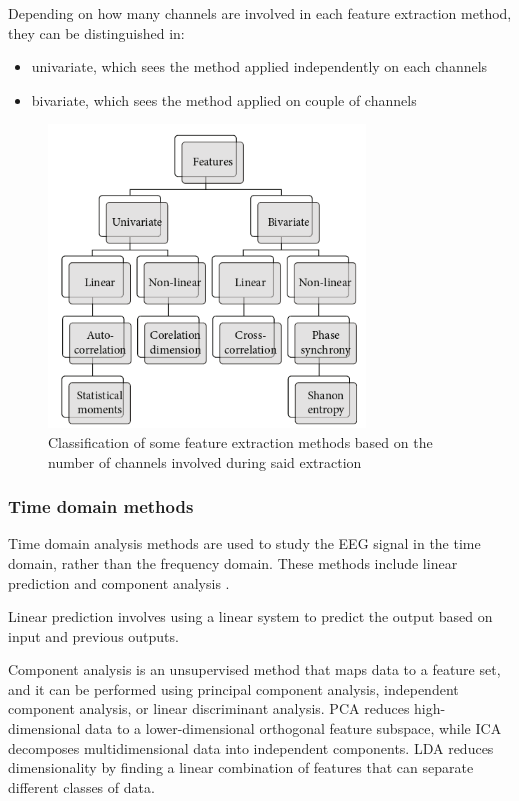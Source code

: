 Depending on how many channels are involved in each feature extraction method, they can be distinguished in:
\begin{itemize}
    \item univariate, which sees the method applied independently on each channels
    \item bivariate, which sees the method applied on couple of channels
\end{itemize}

\begin{figure}[ht]
    \centering
    \includegraphics[width=0.75\textwidth]{images/State-of-art/univariate-bivariate-feature-extraction.png}
    \caption{Classification of some feature extraction methods based on the number of channels involved during said extraction \cite{natu_review_2022}}
    \label{fig:univariate-bivariate-feature-extraction}
\end{figure}

\subsubsection{Time domain methods}
Time domain analysis methods are used to study the \gls{EEG} signal in the time domain, rather than the frequency domain. These methods include linear prediction and component analysis \cite{acharya_automated_2013}. 

Linear prediction involves using a linear system to predict the output based on input and previous outputs.

Component analysis is an unsupervised method that maps data to a feature set, and it can be performed using principal component analysis, independent component analysis, or linear discriminant analysis. 
\gls{PCA} reduces high-dimensional data to a lower-dimensional orthogonal feature subspace, while \gls{ICA} decomposes multidimensional data into independent components. 
\gls{LDA} reduces dimensionality by finding a linear combination of features that can separate different classes of data. 

